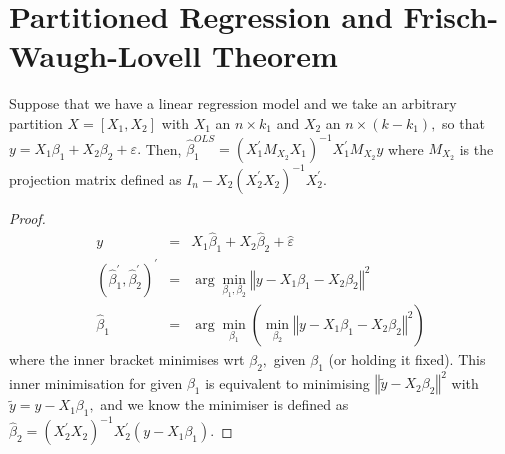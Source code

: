 \documentclass[notes=show]{beamer}
\begin{document}
\section{Partitioned Regression and Frisch-Waugh-Lovell Theorem}

\begin{frame}%

\begin{theorem}
Suppose that we have a linear regression model and we take an arbitrary
partition $X=[X_{1},X_{2}]$ with $X_{1}$ an $n\times k_{1}$ and $X_{2}$ an $%
n\times \left( k-k_{1}\right) ,$ so that $y=X_{1}\beta _{1}+X_{2}\beta
_{2}+\varepsilon .$ Then, $\widehat{\beta }_{1}^{OLS}=(X_{1}^{\prime
}M_{X_{2}}X_{1})^{-1}X_{1}^{\prime }M_{X_{2}}y$ where $M_{X_{2}}$ is the
projection matrix defined as $I_{n}-X_{2}(X_{2}^{\prime
}X_{2})^{-1}X_{2}^{\prime }$.
\end{theorem}

\end{frame}%

\begin{frame}%

\begin{proof}
\begin{eqnarray*}
y &=&X_{1}\widehat{\beta }_{1}+X_{2}\widehat{\beta }_{2}+\hat{\varepsilon} \\
\left( \widehat{\beta }_{1}^{\prime },\widehat{\beta }_{2}^{\prime }\right)
^{\prime } &=&\arg \min_{\beta _{1},\beta _{2}}\left\Vert y-X_{1}\beta
_{1}-X_{2}\beta _{2}\right\Vert ^{2} \\
\widehat{\beta }_{1} &=&\arg \min_{\beta _{1}}\left( \min_{\beta
_{2}}\left\Vert y-X_{1}\beta _{1}-X_{2}\beta _{2}\right\Vert ^{2}\right)
\end{eqnarray*}%
where the inner bracket minimises wrt $\beta _{2},$ given $\beta _{1}$ (or
holding it fixed). This inner minimisation for given $\beta _{1}$ is
equivalent to minimising $\left\Vert \tilde{y}-X_{2}\beta _{2}\right\Vert
^{2}$ with $\tilde{y}=y-X_{1}\beta _{1},$ and we know the minimiser is
defined as $\hat{\beta}_{2}=\left( X_{2}^{\prime }X_{2}\right)
^{-1}X_{2}^{\prime }\left( y-X_{1}\beta _{1}\right) .$
\end{proof}

\end{frame}%
\end{document}
